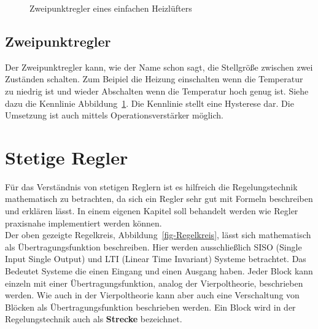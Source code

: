 \documentclass[
  letterpaper,
  DIV=11]{scrreprt}
\begin{document}
\begin{figure}


\caption{\label{fig-zweipunktreglerplot}Zweipunktregler eines einfachen
Heizlüfters}

\end{figure}%

\subsection{Zweipunktregler}\label{zweipunktregler}

Der Zweipunktregler kann, wie der Name schon sagt, die Stellgröße
zwischen zwei Zuständen schalten. Zum Beipiel die Heizung einschalten
wenn die Temperatur zu niedrig ist und wieder Abschalten wenn die
Temperatur hoch genug ist. Siehe dazu die Kennlinie
Abbildung~\ref{fig-zweipunktreglerplot}. Die Kennlinie stellt eine
Hysterese dar. Die Umsetzung ist auch mittels Operationsverstärker
möglich.

\section{Stetige Regler}\label{stetige-regler}

Für das Verständnis von stetigen Reglern ist es hilfreich die
Regelungstechnik mathematisch zu betrachten, da sich ein Regler sehr gut
mit Formeln beschreiben und erklären lässt. In einem eigenen Kapitel
soll behandelt werden wie Regler praxisnahe implementiert werden
können.\\
Der oben gezeigte Regelkreis, Abbildung~\ref{fig-Regelkreis}, lässt sich
mathematisch als Übertragungsfunktion beschreiben. Hier werden
ausschließlich SISO (Single Input Single Output) und LTI (Linear Time
Invariant) Systeme betrachtet. Das Bedeutet Systeme die einen Eingang
und einen Ausgang haben. Jeder Block kann einzeln mit einer
Übertragungsfunktion, analog der Vierpoltheorie, beschrieben werden. Wie
auch in der Vierpoltheorie kann aber auch eine Verschaltung von Blöcken
als Übertragungsfunktion beschrieben werden. Ein Block wird in der
Regelungstechnik auch als \textbf{Strecke} bezeichnet.
\end{document}
